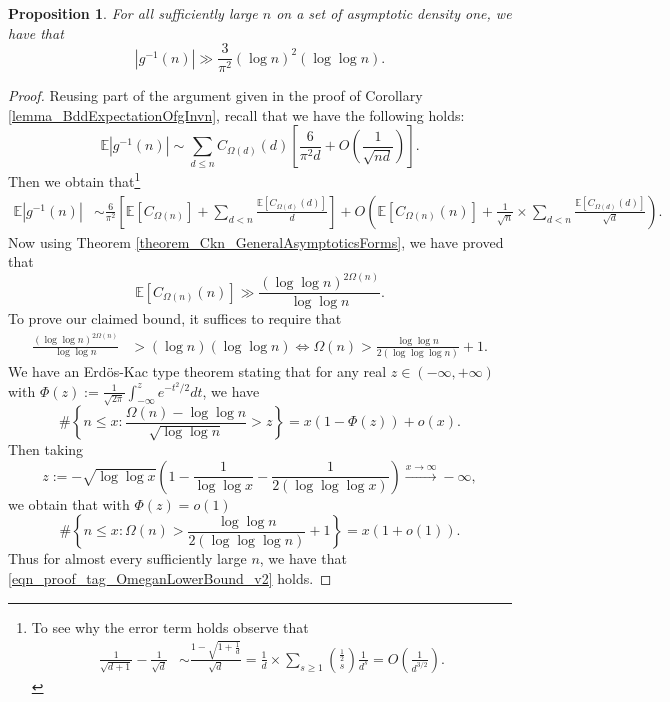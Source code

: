 \documentclass[11pt,reqno,a4letter]{article}
\numberwithin{figure}{section}
\numberwithin{table}{section}
\newcommand{\cf}{\textit{cf.\ }}
\theoremstyle{plain}
\newtheorem{prop}[theorem]{Proposition}
\numberwithin{theorem}{section}
\theoremstyle{definition}
\begin{document}
\begin{prop} 
\label{prop_GInvGeqBehavior_v1} 
For all sufficiently large $n$ on a set of asymptotic density one, we have that 
\[
|g^{-1}(n)| \gg \frac{3}{\pi^2} (\log n)^2 (\log\log n).  
\]
\end{prop} 
\begin{proof} 
Reusing part of the argument given in the proof of 
Corollary \ref{lemma_BddExpectationOfgInvn}, 
recall that we have the following holds: 
\[
\mathbb{E}|g^{-1}(n)| \sim \sum_{d \leq n} C_{\Omega(d)}(d) \left[\frac{6}{\pi^2 d} + 
     O\left(\frac{1}{\sqrt{nd}}\right)\right]. 
\]
Then we obtain that\footnote{ 
     To see why the error term holds observe that 
     \begin{align*} 
     \frac{1}{\sqrt{d+1}} - \frac{1}{\sqrt{d}} & \sim \frac{1-\sqrt{1 + \frac{1}{d}}}{\sqrt{d}} 
          = \frac{1}{d} \times \sum_{s \geq 1} \binom{\frac{1}{2}}{s} \frac{1}{d^s} 
          = O\left(\frac{1}{d^{3/2}}\right). 
     \end{align*} 
}
\begin{align} 
\label{eqn_proof_tag_EAbsgInvn_v2} 
\mathbb{E}|g^{-1}(n)| & \sim \frac{6}{\pi^2} \left[ 
     \mathbb{E}[C_{\Omega(n)}] + \sum_{d < n} \frac{\mathbb{E}[C_{\Omega(d)}(d)]}{d} \right] + 
     O\left(\mathbb{E}[C_{\Omega(n)}(n)] + \frac{1}{\sqrt{n}} \times 
     \sum_{d < n} \frac{\mathbb{E}[C_{\Omega(d)}(d)]}{\sqrt{d}}\right). 
\end{align} 
Now using Theorem \ref{theorem_Ckn_GeneralAsymptoticsForms}, 
we have proved that 
\[
\mathbb{E}[C_{\Omega(n)}(n)] \gg \frac{(\log\log n)^{2\Omega(n)}}{\log\log n}. 
\]
To prove our claimed bound, it suffices to require that 
\begin{align} 
\label{eqn_proof_tag_OmeganLowerBound_v2} 
\frac{(\log\log n)^{2\Omega(n)}}{\log\log n} & > (\log n) (\log\log n) \iff 
     \Omega(n) > \frac{\log\log n}{2(\log\log\log n)} + 1. 
\end{align} 
We have an Erd\"os-Kac type theorem stating that for 
any real $z \in (-\infty, +\infty)$ with 
$\Phi(z) := \frac{1}{\sqrt{2\pi}} \int_{-\infty}^{z} e^{-t^2/2} dt$, 
we have \cite[\S 7.4]{MV} \cite[\cf \S 1.7]{IWANIEC-KOWALSKI} 
\[
\#\left\{n \leq x: \frac{\Omega(n) - \log\log n}{\sqrt{\log\log n}} > z\right\}
     = x\left(1 - \Phi(z)\right) + o(x). 
\]
Then taking 
\[
z := -\sqrt{\log\log x} \left(1 - \frac{1}{\log\log x} - \frac{1}{2(\log\log\log x)}\right) 
     \xrightarrow{x \rightarrow \infty} -\infty, 
\]
we obtain that with $\Phi(z) = o(1)$ 
\[
\#\left\{n \leq x: \Omega(n) > \frac{\log\log n}{2(\log\log\log n)} + 1\right\} = 
     x(1 + o(1)). 
\]
Thus for almost every sufficiently large $n$, we have that 
\eqref{eqn_proof_tag_OmeganLowerBound_v2} holds. 


\end{proof}
\end{document}
